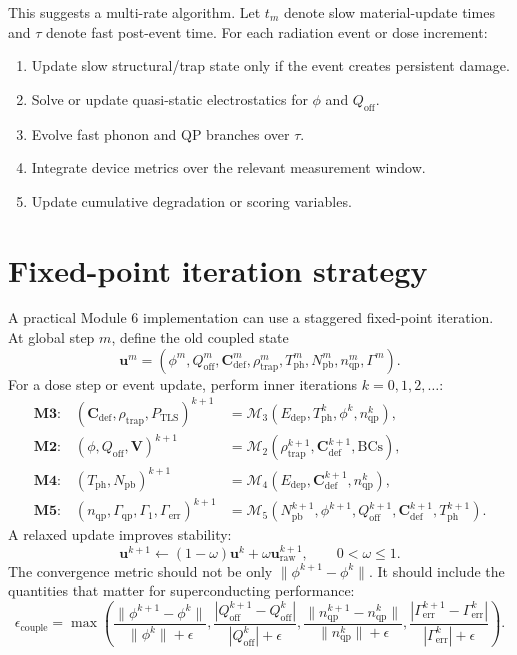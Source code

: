 \documentclass[11pt]{article}
\newcommand{\Edep}{E_{\mathrm{dep}}}
\newcommand{\phiE}{\phi}
\newcommand{\Qoff}{Q_{\mathrm{off}}}
\newcommand{\Vvec}{\bm{V}}
\newcommand{\Cvec}{\bm{C}_{\mathrm{def}}}
\newcommand{\TLS}{\mathrm{TLS}}
\newcommand{\Tph}{T_{\mathrm{ph}}}
\newcommand{\Npb}{N_{\mathrm{pb}}}
\newcommand{\nqp}{n_{\mathrm{qp}}}
\newcommand{\Gammaqp}{\Gamma_{\mathrm{qp}}}
\newcommand{\Gammaone}{\Gamma_1}
\newcommand{\Gammaerr}{\Gamma_{\mathrm{err}}}
\newcommand{\state}{\bm{u}}
\newcommand{\Mtwo}{\mathcal{M}_2}
\newcommand{\Mthree}{\mathcal{M}_3}
\newcommand{\Mfour}{\mathcal{M}_4}
\newcommand{\Mfive}{\mathcal{M}_5}
\begin{document}
This suggests a multi-rate algorithm. Let \(t_m\) denote slow material-update times and \(\tau\) denote fast post-event time. For each radiation event or dose increment:
\begin{enumerate}[leftmargin=2em]
\item Update slow structural/trap state only if the event creates persistent damage.
\item Solve or update quasi-static electrostatics for \(\phiE\) and \(\Qoff\).
\item Evolve fast phonon and QP branches over \(\tau\).
\item Integrate device metrics over the relevant measurement window.
\item Update cumulative degradation or scoring variables.
\end{enumerate}

\section{Fixed-point iteration strategy}

A practical Module 6 implementation can use a staggered fixed-point iteration. At global step \(m\), define the old coupled state
\begin{equation}
\state^m=(\phiE^m,\Qoff^m,\Cvec^m,\rho_{\mathrm{trap}}^m,\Tph^m,\Npb^m,\nqp^m,\Gamma^m).
\end{equation}
For a dose step or event update, perform inner iterations \(k=0,1,2,\ldots\):
\begin{align}
\textbf{M3:}\quad
(\Cvec,\rho_{\mathrm{trap}},P_{\TLS})^{k+1}
&=\Mthree(\Edep,\Tph^k,\phiE^k,\nqp^k),\\
\textbf{M2:}\quad
(\phiE,\Qoff,\Vvec)^{k+1}
&=\Mtwo(\rho_{\mathrm{trap}}^{k+1},\Cvec^{k+1},\mathrm{BCs}),\\
\textbf{M4:}\quad
(\Tph,\Npb)^{k+1}
&=\Mfour(\Edep,\Cvec^{k+1},\nqp^k),\\
\textbf{M5:}\quad
(\nqp,\Gammaqp,\Gammaone,\Gammaerr)^{k+1}
&=\Mfive(\Npb^{k+1},\phiE^{k+1},\Qoff^{k+1},\Cvec^{k+1},\Tph^{k+1}).
\end{align}
A relaxed update improves stability:
\begin{equation}
\state^{k+1}\leftarrow (1-\omega)\state^k+\omega\state^{k+1}_{\mathrm{raw}},
\qquad 0<\omega\le 1.
\end{equation}
The convergence metric should not be only \(\|\phiE^{k+1}-\phiE^k\|\). It should include the quantities that matter for superconducting performance:
\begin{equation}
\epsilon_{\mathrm{couple}}=
\max\left(
\frac{\|\phiE^{k+1}-\phiE^k\|}{\|\phiE^k\|+\epsilon},
\frac{|\Qoff^{k+1}-\Qoff^k|}{|\Qoff^k|+\epsilon},
\frac{\|\nqp^{k+1}-\nqp^k\|}{\|\nqp^k\|+\epsilon},
\frac{|\Gammaerr^{k+1}-\Gammaerr^k|}{|\Gammaerr^k|+\epsilon}
\right).
\end{equation}
\end{document}
